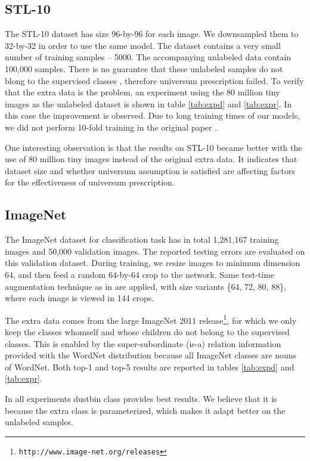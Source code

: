 \documentclass[letterpaper]{article}
\begin{document}
\subsection{STL-10}

The STL-10 dataset \cite{ANL11} has size 96-by-96 for each image. We downsampled them to 32-by-32 in order to use the same model. The dataset contains a very small number of training samples -- 5000. The accompanying unlabeled data contain 100,000 samples. There is no guarantee that these unlabeled samples do not blong to the supervised classes \cite{ANL11}, therefore universum prescription failed. To verify that the extra data is the problem, an experiment using the 80 million tiny images as the unlabeled dataset is shown in table \ref{tab:expd} and \ref{tab:expr}. In this case the improvement is observed. Due to long training times of our models, we did not perform 10-fold training in the original paper \cite{ANL11}.

One interesting observation is that the results on STL-10 became better with the use of 80 million tiny images instead of the original extra data. It indicates that dataset size and whether universum assumption is satisfied are affecting factors for the effectiveness of universum prescription.

\subsection{ImageNet}

The ImageNet dataset \cite{RDSKSMHKKBBF15} for classification task has in total 1,281,167 training images and 50,000 validation images. The reported testing errors are evaluated on this validation dataset. During training, we resize images to minimum dimension 64, and then feed a random 64-by-64 crop to the network. Same test-time augmentation technique as in \cite{SLJSRAEVR15} are applied, with size variants \{64, 72, 80, 88\}, where each image is viewed in 144 crops.

The extra data comes from the large ImageNet 2011 release\footnote{\texttt{http://www.image-net.org/releases}}, for which we only keep the classes whomself and whose children do not belong to the supervised classes. This is enabled by the super-subordinate (is-a) relation information provided with the WordNet distribution \cite{M95} because all ImageNet classes are nouns of WordNet. Both top-1 and top-5 results are reported in tables \ref{tab:expd} and \ref{tab:expr}.

In all experiments dustbin class provides best results. We believe that it is because the extra class is parameterized, which makes it adapt better on the unlabeled samples.
\end{document}
